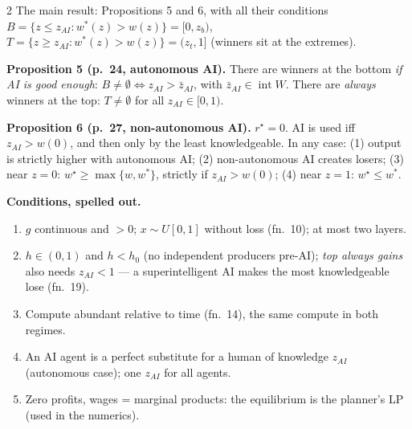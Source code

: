 \documentclass[aspectratio=169,11pt]{beamer}
\begin{document}
\begin{frame}{2 \textperiodcentered{} The main result: Propositions 5 and 6, with all their conditions}
  \footnotesize
  $B=\{z\le z_{AI}: w^*(z)>w(z)\}=[0,z_b)$, \ $T=\{z\ge z_{AI}: w^*(z)>w(z)\}=(z_t,1]$ (winners sit at the extremes).

  \textbf{Proposition 5 (p.\ 24, autonomous AI).} There are winners at the bottom \emph{if AI is good enough}:
  $B\ne\emptyset\iff z_{AI}>\bar z_{AI}$, with $\bar z_{AI}\in\operatorname{int}W$. There are \emph{always} winners at the top:
  $T\ne\emptyset$ for all $z_{AI}\in[0,1)$.

  \textbf{Proposition 6 (p.\ 27, non-autonomous AI).} $r^\star=0$. AI is used iff $z_{AI}>w(0)$, and then only by the least
  knowledgeable. In any case: (1) output is strictly higher with autonomous AI; (2) non-autonomous AI creates losers;
  (3) near $z=0$: $w^\star\ge\max\{w,w^*\}$, strictly if $z_{AI}>w(0)$; (4) near $z=1$: $w^\star\le w^*$.

  \smallskip
  \textbf{Conditions, spelled out.}
  \begin{enumerate}\setlength{\itemsep}{0pt}
    \item $g$ continuous and $>0$; $x\sim U[0,1]$ without loss (fn.\ 10); at most two layers.
    \item $h\in(0,1)$ and $h<h_0$ (no independent producers pre-AI); \emph{top always gains} also needs $z_{AI}<1$ ---
      a superintelligent AI makes the most knowledgeable lose (fn.\ 19).
    \item Compute abundant relative to time (fn.\ 14), the same compute in both regimes.
    \item An AI agent is a perfect substitute for a human of knowledge $z_{AI}$ (autonomous case); one $z_{AI}$ for all agents.
    \item Zero profits, wages = marginal products: the equilibrium is the planner's LP (used in the numerics).
  \end{enumerate}
\end{frame}
\end{document}
